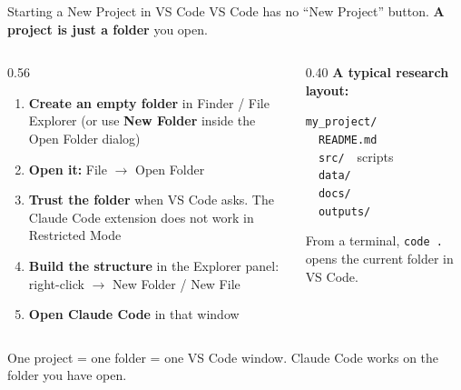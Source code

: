 \documentclass[aspectratio=169, 11pt]{beamer}
\begin{document}
\begin{frame}{Starting a New Project in VS Code}
  VS Code has no ``New Project'' button. \textbf{A project is just a folder} you open.

  \vspace{0.5em}
  \begin{columns}[T]
    \begin{column}{0.56\textwidth}
      \begin{enumerate}
        \item \textbf{Create an empty folder} in Finder / File Explorer (or use \textbf{New Folder} inside the Open Folder dialog)
        \item \textbf{Open it:} File $\rightarrow$ Open Folder
        \item \textbf{Trust the folder} when VS Code asks. The Claude Code extension does not work in Restricted Mode
        \item \textbf{Build the structure} in the Explorer panel: right-click $\rightarrow$ New Folder / New File
        \item \textbf{Open Claude Code} in that window
      \end{enumerate}
    \end{column}
    \begin{column}{0.40\textwidth}
      \textbf{A typical research layout:}
      \vspace{0.2em}

      \texttt{my\_project/}\\
      \texttt{\ \ README.md}\\
      \texttt{\ \ src/}\ \ {\footnotesize scripts}\\
      \texttt{\ \ data/}\\
      \texttt{\ \ docs/}\\
      \texttt{\ \ outputs/}

      \vspace{0.4em}
      {\footnotesize From a terminal, \texttt{code .} opens the current folder in VS Code.}
    \end{column}
  \end{columns}

  \vspace{0.5em}
  \alert{One project = one folder = one VS Code window.} Claude Code works on the folder you have open.
\end{frame}
\end{document}

